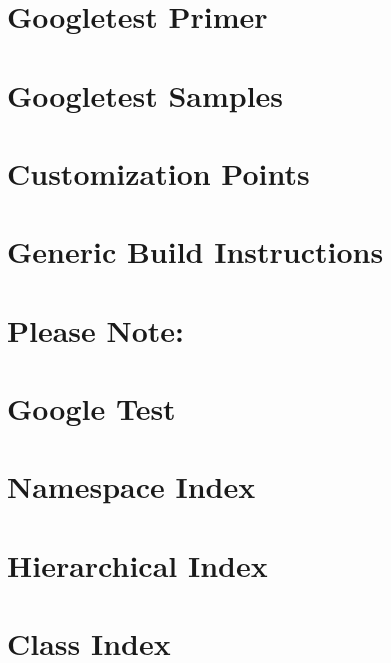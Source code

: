 \let\mypdfximage\pdfximage\def\pdfximage{\immediate\mypdfximage}\documentclass[twoside]{book}
\newcommand{\+}{\discretionary{\mbox{\scriptsize$\hookleftarrow$}}{}{}}
\begin{document}
\chapter{Googletest Primer}
\label{md_lib_googletest-master_googletest_docs_primer}

\chapter{Googletest Samples}
\label{samples}

\chapter{Customization Points}
\label{md_lib_googletest-master_googletest_include_gtest_internal_custom__r_e_a_d_m_e}

\chapter{Generic Build Instructions}
\label{md_lib_googletest-master_googletest__r_e_a_d_m_e}

\chapter{Please Note\+:}
\label{md_lib_googletest-master_googletest_scripts__r_e_a_d_m_e}

\chapter{Google Test}
\label{md_lib_googletest-master__r_e_a_d_m_e}

\chapter{Namespace Index}

\chapter{Hierarchical Index}

\chapter{Class Index}

\end{document}

